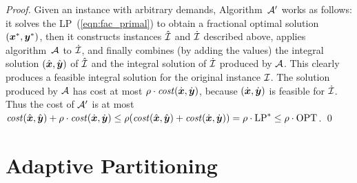 \documentclass{llncs}
\begin{document}

\begin{proof}
  Given an {\FTFP} instance with arbitrary demands, Algorithm~${\cal A}'$ works
as follows: it solves the LP~(\ref{eqn:fac_primal}) to obtain a
  fractional optimal solution $(\boldsymbol{x}^\ast,\boldsymbol{y}^\ast)$, then it constructs
  instances ${\hat{\cal I}}$ and ${\dot{\cal I}}$ described above,  applies
  algorithm~${\cal A}$ to ${\dot{\cal I}}$, and finally combines (by adding
  the values) the integral solution $(\hat{\boldsymbol{x}}, \hat{\boldsymbol{y}})$ of
  ${\hat{\cal I}}$ and the integral solution of ${\dot{\cal I}}$ produced
  by ${\cal A}$. This clearly produces a feasible integral
  solution for the original instance $\mathcal{I}$.
The solution produced by ${\cal A}$ has cost at most
$\rho\cdot{\it cost}(\dot{\boldsymbol{x}},\dot{\boldsymbol{y}})$, because $(\dot{\boldsymbol{x}},\dot{\boldsymbol{y}})$
is feasible for ${\dot{\cal I}}$. Thus the cost of ${\cal A}'$ is at most
% 
$
 {\it cost}(\hat{\boldsymbol{x}}, \hat{\boldsymbol{y}}) + \rho\cdot{\it cost}(\dot{\boldsymbol{x}},\dot{\boldsymbol{y}})
	\le
 \rho({\it cost}(\hat{\boldsymbol{x}}, \hat{\boldsymbol{y}}) + {\it cost}(\dot{\boldsymbol{x}},\dot{\boldsymbol{y}}))
		= \rho\cdot\mbox{\rm LP}^\ast \le \rho\cdot\mbox{\rm OPT}
$. 
\qed
\end{proof}


\section{Adaptive Partitioning}
\label{sec: adaptive partitioning}
\end{document}
